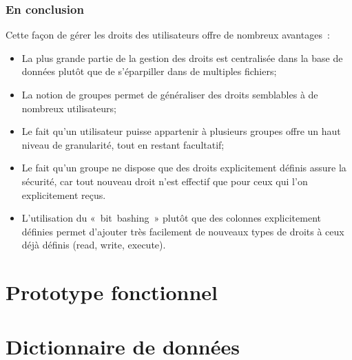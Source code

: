 \documentclass[letter, 11pt]{report}
\begin{document}
\subsection{En conclusion}
Cette façon de gérer les droits des utilisateurs offre de nombreux avantages~:

\begin{itemize}
	\item La plus grande partie de la gestion des droits est centralisée dans la base de données plutôt que de s'éparpiller dans de multiples fichiers;
	\item La notion de groupes permet de généraliser des droits semblables à de nombreux utilisateurs;
	\item Le fait qu'un utilisateur puisse appartenir à plusieurs groupes offre un haut niveau de granularité, tout en restant facultatif;
	\item Le fait qu'un groupe ne dispose que des droits explicitement définis assure la sécurité, car tout nouveau droit n'est effectif que pour ceux qui l'on explicitement reçus.
	\item L'utilisation du «~bit~bashing~» plutôt que des colonnes explicitement définies permet d'ajouter très facilement de nouveaux types de droits à ceux déjà définis (read, write, execute).
\end{itemize}

\chapter{Prototype fonctionnel}

\appendix

\chapter{Dictionnaire de données}


\listoffigures
\listoftables
\end{document}

